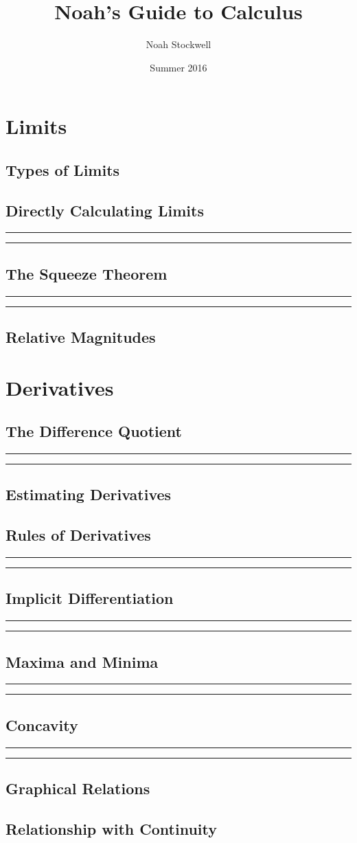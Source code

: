 \documentclass{article}
\title{Noah's Guide to Calculus}
\author{Noah Stockwell}
\date{Summer 2016}
\newcommand{\newchapter}[2]
{
	\subsection{#1}\noindent\rule[0.5ex]{\linewidth}{1pt}\newpage\noindent\rule[0.5ex]{\linewidth}{1pt}\newpage\newpage
}
\begin{document}
\maketitle
\vspace{2in}
\begin{center}\end{center}
\newpage

\newpage
\tableofcontents
\newpage
\section{Limits} 
\subsection{Types of Limits}  
\newchapter{Directly Calculating Limits}{DirectlyCalculatingLimits}
\newchapter{The Squeeze Theorem}{SqueezeTheorem}
\subsection{Relative Magnitudes} \newpage
\section{Derivatives} 
\newchapter{The Difference Quotient}{DifferenceQuotient}
\subsection{Estimating Derivatives}
\newchapter{Rules of Derivatives}{DerivativeRules}
\newchapter{Implicit Differentiation}{ImplicitDifferentiation}
\newchapter{Maxima and Minima}{MaxAndMin}
\newchapter{Concavity}{Concavity}
\subsection{Graphical Relations} 
\subsection{Relationship with Continuity} 
\newpage
\end{document}
